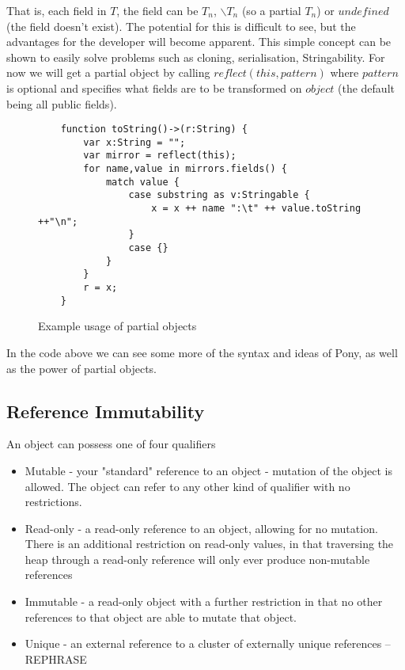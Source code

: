 \documentclass{article}
\begin{document}
That is, each field in $T$, the field can be $T_{n}$, $\backslash T_{n}$ (so a
partial $T_{n}$) or $undefined$ (the field doesn't exist). The potential for
this is difficult to see, but the advantages for the developer will become
apparent. This simple concept can be shown to easily solve problems such as
cloning, serialisation, Stringability. For now we will get a partial object by
calling $reflect(this,pattern)$ where $pattern$ is optional and specifies what
fields are to be transformed on $object$ (the default being all public fields).

\begin{figure}[H]
\begin{verbatim}
    function toString()->(r:String) {
        var x:String = "";
        var mirror = reflect(this);
        for name,value in mirrors.fields() {
            match value {
                case substring as v:Stringable {
                    x = x ++ name ":\t" ++ value.toString ++"\n";
                }
                case {}
            }
        }
        r = x;
    }
\end{verbatim}
\caption{Example usage of partial objects}
\label{fig:partialobj}
\end{figure}

In the code above we can see some more of the syntax and ideas of Pony, as well
as the power of partial objects.

\subsection{Reference Immutability}
\label{sec:immutability}
An object can possess one of four qualifiers\cite{microsoft2012}

\begin{itemize}
	\item Mutable - your "standard" reference to an object - mutation of the object
	is allowed. The object can refer to any other kind of qualifier with no restrictions.
	\item Read-only - a read-only reference to an object, allowing for no mutation.
	There is an additional restriction on read-only values, in that traversing the heap
	through a read-only reference will only ever produce non-mutable references
	\item Immutable - a read-only object with a further restriction in that no other
	references to that object are able to mutate that object.
	\item Unique - an external reference to a cluster of externally unique references -- REPHRASE
\end{itemize}
\end{document}
